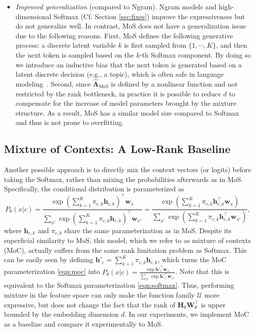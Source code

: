 \begin{itemize}[leftmargin=1.5em,label=$\bullet$]
\item \textit{Improved generalization} (compared to Ngram). Ngram models and high-dimensional Softmax (Cf. Section \ref{sec:fixes}) improve the expressiveness but do not generalize well. In contrast, MoS does not have a generalization issue due to the following reasons. First, MoS defines the following generative process: a discrete latent variable $k$ is first sampled from $\{1, \cdots, K\}$, and then the next token is sampled based on the $k$-th Softmax component. By doing so we introduce an inductive bias that the next token is generated based on a latent discrete decision (e.g., a topic), which is often safe in language modeling~\citep{blei2003latent}. Second, since $\hat{\mathbf{A}}_\text{MoS}$ is defined by a nonlinear function and not restricted by the rank bottleneck, in practice it is possible to reduce $d$ to compensate for the increase of model parameters brought by the mixture structure. As a result, MoS has a similar model size compared to Softmax and thus is not prone to overfitting.
\end{itemize}


\subsection{Mixture of Contexts: A Low-Rank Baseline}
Another possible approach is to directly mix the context vectors (or logits) before taking the Softmax, rather than mixing the probabilities afterwards as in MoS. Specifically, the conditional distribution is parameterized as
\vspace{-0.5em}
\begin{equation}\label{eqn:moc}
P_\theta(x | c) 
= \frac{\exp \left( \sum_{k=1}^{K} \pi_{c,k}\mathbf{h}_{c,k} \right)^\top \mathbf{w}_x }{\sum_{x'} \exp \left( \sum_{k=1}^{K} \pi_{c,k} \mathbf{h}_{c,k} \right)^\top \mathbf{w}_{x'} }
= \frac{\exp \left( \sum_{k=1}^{K} \pi_{c,k}\mathbf{h}_{c,k}^\top \mathbf{w}_x \right) }{\sum_{x'} \exp \left( \sum_{k=1}^{K} \pi_{c,k} \mathbf{h}_{c,k}^\top \mathbf{w}_{x'} \right) },
\end{equation}
where $\mathbf{h}_{c,k}$ and $\pi_{c,k}$ share the same parameterization as in MoS.
Despite its superficial similarity to MoS, this model, which we refer to as mixture of contexts (MoC), actually suffers from the same rank limitation problem as Softmax.
This can be easily seen by defining $\mathbf{h'}_{c} = \sum_{k=1}^{K} \pi_{c,k} \mathbf{h}_{c,k}$, which turns the MoC parameterization \eqref{eqn:moc} into 
$
P_\theta(x | c) = \frac{\exp \mathbf{h'}^\top_c \mathbf{w}_x}{\sum_{x'} \exp \mathbf{h'}^\top_c \mathbf{w}_{x'}}
$. Note that this is equivalent to the Softmax parameterization \eqref{eqn:softmax}.
Thus, performing mixture in the feature space can only make the function family $\mathcal{U}$ more expressive, but does not change the fact that the rank of $\mathbf{H}_{\theta} \mathbf{W}_\theta^\top$ is upper bounded by the embedding dimension $d$.
In our experiments, we implement MoC as a baseline and compare it experimentally to MoS.

